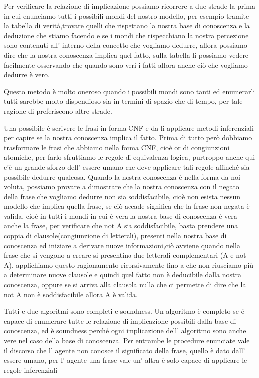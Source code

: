 		Per verificare la relazione di implicazione possiamo ricorrere a due strade la prima in cui enunciamo tutti i possibili mondi del nostro modello, per esempio tramite la tabella di verità,trovare quelli che rispettano la nostra base di conoscenza e la deduzione che stiamo facendo e se i mondi che rispecchiano la nostra percezione sono contenuti all' interno della concetto che vogliamo dedurre, allora possiamo dire che la nostra conoscenza implica quel fatto, sulla tabella li possiamo vedere facilmente osservando che quando sono veri i fatti allora anche ciò che vogliamo dedurre è vero.
		\par
		Questo metodo è molto oneroso quando i possibili mondi sono tanti ed enumerarli tutti sarebbe molto dispendioso sia in termini di spazio che di tempo, per tale ragione di preferiscono altre strade.
		\par
		Una possibile è scrivere le frasi in forma CNF e da li applicare metodi inferenziali per capire se la nostra conoscenza implica il fatto. 
		Prima di tutto però dobbiamo trasformare le frasi che abbiamo nella forma CNF, cioè or di congiunzioni atomiche, per farlo sfruttiamo le regole di equivalenza logica, purtroppo anche qui c'è un grande sforzo dell' essere umano che deve applicare tali regole affinché sia possibile dedurre qualcosa.
		Quando la nostra conoscenza è nella forma da noi voluta, possiamo provare a dimostrare che la nostra conoscenza con il negato della frase che vogliamo dedurre non sia soddisfacibile, cioè non esista nessun modello che implica quella frase, se ciò accade significa che la frase non negata è valida, cioè in tutti i mondi in cui è vera la nostra base di conoscenza è vera anche la frase, per verificare che not A sia soddisfacibile, basta prendere una coppia di clausole(congiunzione di letterali), presenti nella nostra base di conoscenza ed iniziare a derivare nuove informazioni,ciò avviene quando nella frase che si vengono a creare si presentino due letterali complementari (A e not A),
		applichiamo questo ragionamento ricorsivamente fino a che non riusciamo più a determinare nuove clausole e quindi quel fatto non è deducibile dalla nostra conoscenza, oppure se si arriva alla clausola nulla che ci permette di dire che la not A non è soddisfacibile allora A è valida.
		\par
		Tutti e due algoritmi sono completi e soundness.
		Un algoritmo è completo se é capace di enumerare tutte le relazione di implicazione possibili dalla base di conoscenza, ed è soundness perché ogni implicazione dell' algoritmo sono anche vere nel caso della base di conoscenza.
		Per entrambe le procedure enunciate vale il discorso che l' agente non conosce il significato della frase, quello è dato dall' essere umano, per l' agente una frase vale un' altra è solo capace di applicare le regole inferenziali
